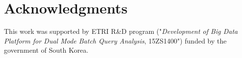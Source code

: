 \documentclass{sig-alternate-05-2015}
\begin{document}
\section*{Acknowledgments}
This work was supported by ETRI R\&D program ("\textit{Development of Big Data Platform for Dual Mode Batch Query Analysis}, 15ZS1400") funded by the government of South Korea.














































\small{


}
\end{document}
